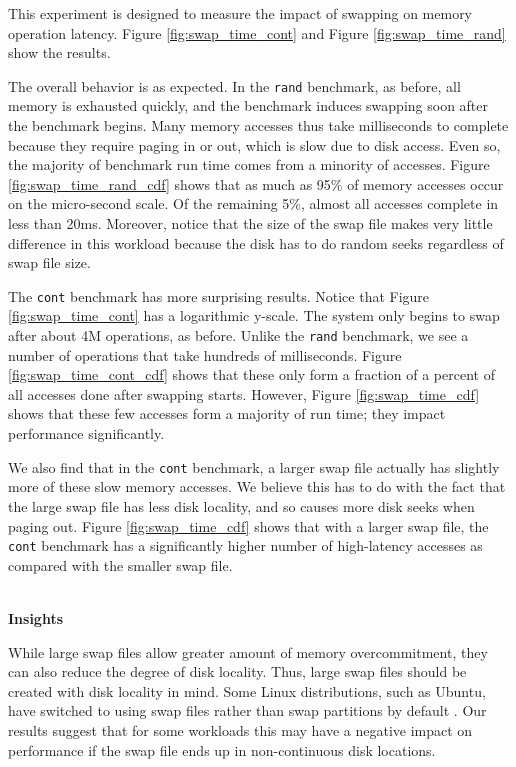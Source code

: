 \documentclass[twocolumn,11pt]{article}
\begin{document}
This experiment is designed to measure the impact of swapping on memory
operation latency. Figure \ref{fig:swap_time_cont} and Figure
\ref{fig:swap_time_rand} show the results.

The overall behavior is as expected. In the \texttt{rand} benchmark, as before, all
memory is exhausted quickly, and the benchmark induces swapping soon after the
benchmark begins. Many memory accesses thus take milliseconds to complete
because they require paging in or out, which is slow due to disk access.
Even so, the majority of benchmark run time comes from a minority of accesses.
Figure \ref{fig:swap_time_rand_cdf} shows that as much as 95\% of memory
accesses occur on the micro-second scale. Of the remaining 5\%, almost all
accesses complete in less than 20ms. Moreover, notice that the size of the
swap file makes very little difference in this workload because the disk has to
do random seeks regardless of swap file size.

The \texttt{cont} benchmark has more surprising results. Notice that Figure
\ref{fig:swap_time_cont} has a logarithmic y-scale. The system only begins to
swap after about 4M operations, as before. Unlike the \texttt{rand} benchmark, we see a
number of operations that take hundreds of milliseconds. Figure
\ref{fig:swap_time_cont_cdf} shows that these only form a fraction of a percent
of all accesses done after swapping starts. However, Figure
\ref{fig:swap_time_cdf} shows that these few accesses form a majority of run
time; they impact performance significantly.

We also find that in the \texttt{cont} benchmark, a larger swap file actually has
slightly more of these slow memory accesses. We believe this has to do with the
fact that the large swap file has less disk locality, and so causes more disk
seeks when paging out. Figure \ref{fig:swap_time_cdf} shows that with a larger
swap file, the \texttt{cont} benchmark has a significantly higher number of
high-latency accesses as compared with the smaller swap file.

~\\ \textbf{Insights} 

While large swap files allow greater amount of memory overcommitment, they can
also reduce the degree of disk locality. Thus, large swap files should be
created with disk locality in mind. Some Linux distributions, such as
Ubuntu, have switched to using swap files rather than swap partitions by default
\cite{swap_ubuntu}. Our results suggest that for some workloads this may have a
negative impact on performance if the swap file ends up in non-continuous disk
locations.
\end{document}
